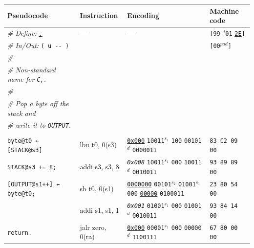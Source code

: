 \documentclass[a4paper,12pt,final]{article}
\begin{document}
\begin{table}[!htbp] \begin{adjustwidth}{-1cm}{-1cm} \fontsize{8}{9.600000}\selectfont
\begin{center}
\begin{tabular}{l|ll|l}
\textbf{Pseudocode} & \textbf{Instruction} & \textbf{Encoding} & \textbf{Machine code}\\[0pt]
\hline
\emph{\# Define:} \uline{\texttt{.}} & --- & --- & \texttt{[99} \(^{d}\)​\texttt{01} \uline{\texttt{2E}}​\texttt{]}\\[0pt]
\emph{\# In/Out:} \texttt{( u -​- )} &  &  & \texttt{[00}​\(^{pad}\)​\texttt{]}\\[0pt]
\emph{\#} &  &  & \\[0pt]
\emph{\# Non-standard name for \texttt{C,}.} &  &  & \\[0pt]
\emph{\#} &  &  & \\[0pt]
\emph{\# Pop a byte off the stack and} &  &  & \\[0pt]
\emph{\# write it to \texttt{OUTPUT}.} &  &  & \\[0pt]
 &  &  & \\[0pt]
\texttt{byte@t0 ← [STACK@s3]} & lbu t0, 0(s3) & \uline{\texttt{0x000}}                    \texttt{10011}​\(^{s_{1}}\) \texttt{100} \texttt{00101}​\(^{d}\)  \texttt{0000011} & \texttt{83 C2 09 00}\\[0pt]
\texttt{STACK@s3 += 8;} & addi s3, s3, 8 & \emph{\texttt{0x008}}                    \texttt{10011}​\(^{s_{1}}\) \texttt{000} \texttt{10011}​\(^{d}\)  \texttt{0010011} & \texttt{93 89 89 00}\\[0pt]
\texttt{[OUTPUT@s1++] ← byte@t0;} & sb t0, 0(s1) & \uline{\texttt{0000000}} \texttt{00101}​\(^{s_{2}}\) \texttt{01001}​\(^{s_{1}}\) \texttt{000} \uline{\texttt{00000}} \texttt{0100011} & \texttt{23 80 54 00}\\[0pt]
 & addi s1, s1, 1 & \emph{\texttt{0x001}}                    \texttt{01001}​\(^{s_{1}}\) \texttt{000} \texttt{01001}​\(^{d}\)  \texttt{0010011} & \texttt{93 84 14 00}\\[0pt]
\texttt{return.} & jalr zero, 0(ra) & \uline{\texttt{0x000}}                    \texttt{00001}​\(^{s_{1}}\) \texttt{000} \texttt{00000}​\(^{d}\)  \texttt{1100111} & \texttt{67 80 00 00}\\[0pt]
\end{tabular}

\end{center}
\normalsize \end{adjustwidth} \end{table} \vspace{0}
\end{document}

